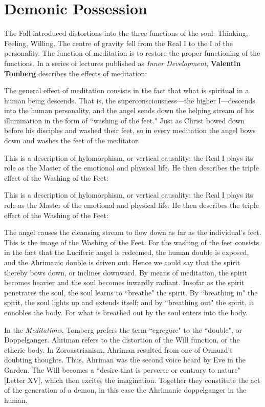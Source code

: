 \section{Demonic Possession}


The Fall introduced distortions into the three functions of the soul: Thinking, Feeling, Willing. The centre of gravity fell from the Real I to the I of the personality. The function of meditation is to restore the proper functioning of the functions. In a series of lectures published as \emph{Inner Development}, \textbf{Valentin Tomberg} describes the effects of meditation:

\begin{quotex}
The general effect of meditation consists in the fact that what is spiritual in a human being descends. That is, the superconsciousness—the higher I—descends into the human personality, and the angel sends down the helping stream of his illumination in the form of ``washing of the feet." Just as Christ bowed down before his disciples and washed their feet, so in every meditation the angel bows down and washes the feet of the meditator. 

\end{quotex}
This is a description of hylomorphism, or vertical causality: the Real I plays its role as the Master of the emotional and physical life. He then describes the triple effect of the Washing of the Feet:

This is a description of hylomorphism, or vertical causality: the Real I plays its role as the Master of the emotional and physical life. He then describes the triple effect of the Washing of the Feet:

\begin{quotex}
The angel causes the cleansing stream to flow down as far as the individual's feet. This is the image of the Washing of the Feet. For the washing of the feet consists in the fact that the Luciferic angel is redeemed, the human double is exposed, and the Ahrimanic double is driven out. Hence we could say that the spirit thereby bows down, or inclines downward. By means of meditation, the spirit becomes heavier and the soul becomes inwardly radiant. Insofar as the spirit penetrates the soul, the soul learns to ``breathe" the spirit. By ``breathing in" the spirit, the soul lights up and extends itself; and by ``breathing out" the spirit, it ennobles the body. For what is breathed out by the soul enters into the body. 

\end{quotex}
In the \emph{Meditations}, Tomberg prefers the term ``egregore" to the ``double", or Doppelganger. Ahriman refers to the distortion of the Will function, or the etheric body. In Zoroastrianism, Ahriman resulted from one of Ormuzd's doubting thoughts. Thus, Ahriman was the second voice heard by Eve in the Garden. The Will becomes a ``desire that is perverse or contrary to nature" [Letter XV], which then excites the imagination. Together they constitute the act of the generation of a demon, in this case the Ahrimanic doppelganger in the human.

